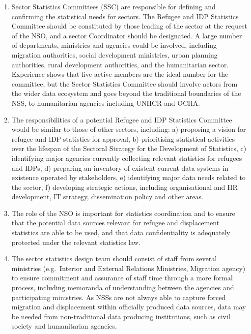 \documentclass[
]{article}
\begin{document}
\begin{enumerate}
\def\labelenumi{\arabic{enumi}.}
\setcounter{enumi}{37}
\item
  Sector Statistics Committees (SSC) are responsible for defining and
  confirming the statistical needs for sectors. The Refugee and IDP
  Statistics Committee should be constituted by those leading of the
  sector at the request of the NSO, and a sector Coordinator should be
  designated. A large number of departments, ministries and agencies
  could be involved, including migration authorities, social
  development ministries, urban planning authorities, rural
  development authorities, and the humanitarian sector. Experience
  shows that five active members are the ideal number for the
  committee, but the Sector Statistics Committee should involve actors
  from the wider data ecosystem and goes beyond the traditional
  boundaries of the NSS, to humanitarian agencies including UNHCR and
  OCHA.
\item
  The responsibilities of a potential Refugee and IDP Statistics
  Committee would be similar to those of other sectors, including: a)
  proposing a vision for refugee and IDP statistics for approval, b)
  prioritising statistical activities over the lifespan of the
  Sectoral Strategy for the Development of Statistics, c) identifying
  major agencies currently collecting relevant statistics for refugees
  and IDPs, d) preparing an inventory of existent current data systems
  in existence operated by stakeholders, e) identifying major data
  needs related to the sector, f) developing strategic actions,
  including organisational and HR development, IT strategy,
  dissemination policy and other areas.
\item
  The role of the NSO is important for statistics coordination and to
  ensure that the potential data sources relevant for refugee and
  displacement statistics are able to be used, and that data
  confidentiality is adequately protected under the relevant
  statistics law.
\item
  The sector statistics design team should consist of staff from
  several ministries (e.g.~Interior and External Relations Ministries,
  Migration agency) to ensure commitment and assurance of staff time
  through a more formal process, including memoranda of understanding
  between the agencies and participating ministries. As NSSs are not
  always able to capture forced migration and displacement within
  officially produced data sources, data may be needed from
  non-traditional data producing institutions, such as civil society
  and humanitarian agencies.
\end{enumerate}
\end{document}
